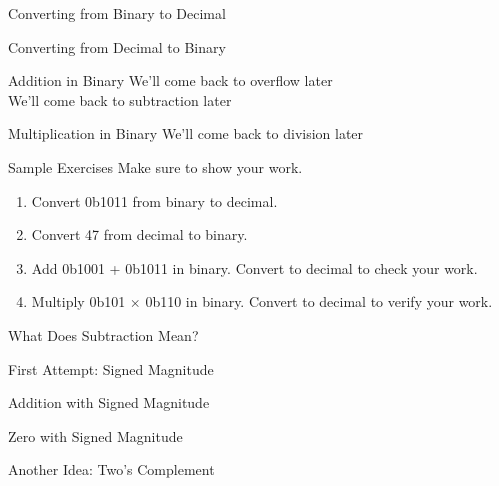 \begin{frame}{Converting from Binary to Decimal}
\end{frame}

\begin{frame}{Converting from Decimal to Binary}
\end{frame}

\begin{frame}{Addition in Binary}
We'll come back to overflow later \\
We'll come back to subtraction later
\end{frame}
    
\begin{frame}{Multiplication in Binary}
We'll come back to division later
\end{frame}

\begin{frame}{Sample Exercises}
Make sure to show your work.
\vfill 
\begin{enumerate}
    \item Convert 0b1011 from binary to decimal. 
    \vfill
    \item Convert 47 from decimal to binary.
    \vfill
    \item Add 0b1001 + 0b1011 in binary. Convert to decimal to check your work.
    \vfill
    \item Multiply 0b101 $\times$ 0b110 in binary. Convert to decimal to verify your work.
    \vfill 
\end{enumerate}
\end{frame}


\begin{frame}{What Does Subtraction Mean?}
\end{frame}

\begin{frame}{First Attempt: Signed Magnitude}
\end{frame}

\begin{frame}{Addition with Signed Magnitude}
\end{frame}

\begin{frame}{Zero with Signed Magnitude}
\end{frame}

\begin{frame}{Another Idea: Two's Complement}
\end{frame}

